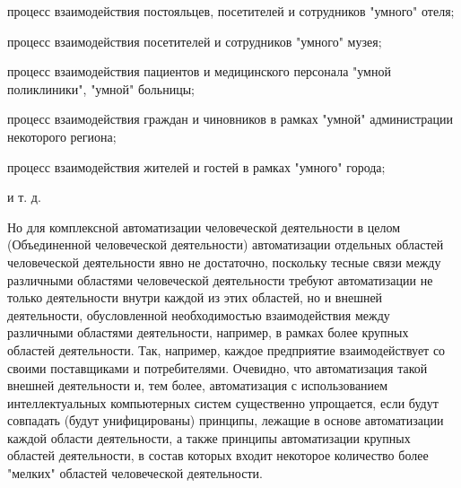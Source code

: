 {\begin{scnitemize}
    \item процесс взаимодействия постояльцев, посетителей и сотрудников "умного"{} отеля;
    \item процесс взаимодействия посетителей и сотрудников "умного"{} музея;
    \item процесс взаимодействия пациентов и медицинского персонала "умной поликлиники"{}, "умной"{} больницы;
    \item процесс взаимодействия граждан и чиновников в рамках "умной"{} администрации некоторого региона;
    \item процесс взаимодействия жителей и гостей в рамках "умного"{} города;
    \item и т. д.
\end{scnitemize}
Но для комплексной автоматизации человеческой деятельности в целом (Объединенной человеческой деятельности) автоматизации отдельных областей человеческой деятельности явно не достаточно, поскольку тесные связи между различными областями человеческой деятельности требуют автоматизации не только деятельности внутри каждой из этих областей, но и внешней деятельности, обусловленной необходимостью взаимодействия между различными областями деятельности, например, в рамках более крупных областей деятельности. Так, например, каждое предприятие взаимодействует со своими поставщиками и потребителями. Очевидно, что автоматизация такой внешней деятельности и, тем более, автоматизация с использованием интеллектуальных компьютерных систем существенно упрощается, если будут совпадать (будут унифицированы) принципы, лежащие в основе автоматизации каждой области деятельности, а также принципы автоматизации крупных областей деятельности, в состав которых входит некоторое количество более "мелких"{} областей человеческой деятельности.

}
